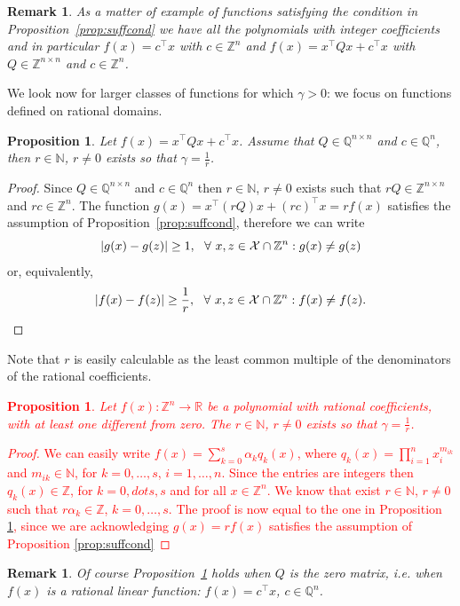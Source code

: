 \documentclass[preprint,12pt]{elsarticle}
\newcommand{\red}[1]{\textcolor{red}{#1}}
\newtheorem{proposition}[theorem]{Proposition}
\newtheorem{remark}[theorem]{Remark}
\def\setR{\mathbb{R}}
\def\setN{\mathbb{N}}
\def\setZ{\mathbb{Z}}
\def\setZn{\mathbb{Z}^n}
\def\X{{\cal X}}
\def\Q{\mathbb{Q}}
\def\Z{\mathbb{Z}}
\def\N{\mathbb{N}}
\begin{document}
\begin{remark}As a matter of example of functions satisfying the condition in Proposition~\ref{prop:suffcond} we have all the polynomials with integer coefficients and in particular  $f(x) = c^\top x$ with  $c\in \Z^n$ and $f(x) = x^\top Q x + c^\top x$ with $Q \in \Z^{n\times n}$ and $c \in \Z^n$.
\end{remark}
We look now for larger classes of functions for which $\gamma >0$: we focus on functions defined on rational domains.
\begin{proposition}\label{prop:condquad}
Let $f(x) = x^\top Q x + c^\top x $.
Assume that $Q \in \Q^{n\times n}$ and $c \in \Q^n$, then $r \in \N$, $r\neq 0$ exists so that $\gamma = \frac{1}{r}$.
\end{proposition}
\begin{proof}
Since $Q \in \Q^{n\times n}$ and $c \in \Q^n$ then $r \in \N$, $r\neq 0$ exists such that $rQ \in \Z^{n\times n}$ and $rc \in \Z^n$.
The function $g(x) = x^\top (rQ) x + (rc)^\top x = r f(x)$ satisfies the assumption of Proposition~\ref{prop:suffcond}, therefore we can write
\[
| g(x) - g(z) | \ge 1, \ \ \forall \ x,z \in \X \cap \Z^n: g(x) \neq g(z) \\
\]
or, equivalently,
\[
| f(x) - f(z) | \ge \frac{1}{r}, \ \ \forall \ x,z \in \X\cap \Z^n : f(x) \neq f(z).
\]
\end{proof}

Note that $r$ is easily calculable as the least common multiple of the denominators of the rational coefficients.

\red{
\begin{proposition}
 Let $f(x): \setZn \rightarrow \setR$ be a polynomial with rational coefficients, with at least one different from zero. The $r \in \setN$, $r \neq 0$ exists so that $\gamma = \frac{1}{r}$.
\end{proposition}
\begin{proof}
We can easily write $ f(x) = \sum_{k = 0}^{s} \alpha_k q_k(x)$, where $q_k(x) = \prod_{i=1}^n x_i^{m_{i k}}$ and $m_{i k } \in \setN$, for $k=0,\dots,s$, $i = 1, \dots, n$. Since the entries are integers then $q_k(x) \in \setZ$, for $k = 0,dots, s$ and for all $x \in \setZn$. We know that exist $r \in \setN$, $r \neq 0$ such that $r \alpha_k \in \setZ$, $k=0,\dots,s$. The proof is now equal to the one in Proposition \ref{prop:condquad}, since we are acknowledging $g(x) = r f(x) $ satisfies the assumption of Proposition \ref{prop:suffcond}
\end{proof}
}
\begin{remark}
Of course Proposition~\ref{prop:condquad}  holds when $Q$ is the zero matrix, i.e. when $f(x)$ is a rational linear function: $f(x) = c^\top x $,  $c \in \Q^n$.
\end{remark}
\end{document}
